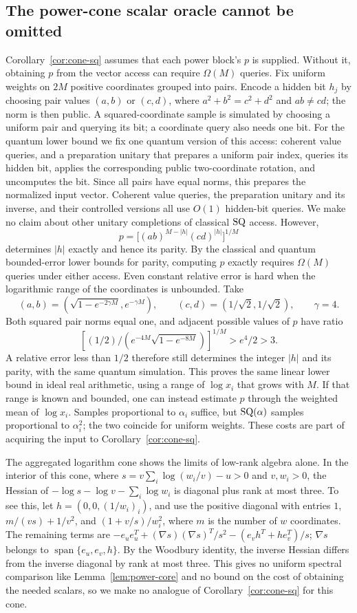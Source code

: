 \subsection{The power-cone scalar oracle cannot be omitted}
Corollary~\ref{cor:cone-sq} assumes that each power block's $p$ is
supplied. Without it, obtaining $p$ from the vector access can require
$\Omega(M)$ queries. Fix uniform weights on $2M$ positive coordinates
grouped into pairs. Encode a hidden bit $h_j$ by choosing pair values
$(a,b)$ or $(c,d)$, where $a^2+b^2=c^2+d^2$ and $ab\ne cd$; the norm is
then public. A squared-coordinate sample is simulated by choosing a
uniform pair and querying its bit; a coordinate query also needs one bit.
For the quantum lower bound we fix one quantum version of this access:
coherent value queries, and a preparation unitary that prepares a uniform
pair index, queries its hidden bit, applies the corresponding public
two-coordinate rotation, and uncomputes the bit. Since all pairs have
equal norms, this prepares the normalized input vector. Coherent value
queries, the preparation unitary and its inverse, and their controlled
versions all use $O(1)$ hidden-bit queries. We make no claim about other
unitary completions of classical $\mathrm{SQ}$ access. However,
\[
 p=\big[(ab)^{M-|h|}(cd)^{|h|}\big]^{1/M}
\]
determines $|h|$ exactly and hence its parity. By the classical and
quantum bounded-error lower bounds for parity, computing $p$ exactly
requires $\Omega(M)$ queries under either access.
Even constant relative error is hard when the logarithmic range of the
coordinates is unbounded. Take
\[
 (a,b)=(\sqrt{1-e^{-2\gamma M}},e^{-\gamma M}),\qquad
 (c,d)=(1/\sqrt2,1/\sqrt2),\qquad \gamma=4.
\]
Both squared pair norms equal one, and adjacent possible values of $p$
have ratio
\[
 [(1/2)/(e^{-4M}\sqrt{1-e^{-8M}})]^{1/M}>e^4/2>3.
\]
A relative error less than $1/2$ therefore still determines the integer
$|h|$ and its parity, with the same quantum simulation. This proves the
same linear lower bound in ideal real arithmetic, using a range of
$\log x_i$ that grows with $M$. If that range is known and bounded, one
can instead estimate $p$ through the weighted mean of $\log x_i$. Samples
proportional to $\alpha_i$ suffice, but $\mathrm{SQ}(\alpha)$ samples
proportional to $\alpha_i^2$; the two coincide for uniform weights. These
costs are part of acquiring the input to Corollary~\ref{cor:cone-sq}.

The aggregated logarithm cone shows the limits of low-rank algebra alone.
In the interior of this cone, where $s=v\sum_i\log(w_i/v)-u>0$ and
$v,w_i>0$, the Hessian of
$-\log s-\log v-\sum_i\log w_i$ is diagonal plus rank at most three.
To see this, let $h=(0,0,(1/w_i)_i)$, and use the positive diagonal
with entries $1$, $m/(vs)+1/v^2$, and $(1+v/s)/w_i^2$, where $m$
is the number of $w$ coordinates. The remaining terms are
$-e_ue_u^T+(\nabla s)(\nabla s)^T/s^2-(e_vh^T+he_v^T)/s$;
$\nabla s$ belongs to $\operatorname{span}\{e_u,e_v,h\}$.
By the Woodbury identity, the inverse Hessian differs from the inverse
diagonal by rank at most three. This gives no uniform spectral comparison
like Lemma~\ref{lem:power-core} and no bound on the cost of obtaining the
needed scalars, so we make no analogue of Corollary~\ref{cor:cone-sq}
for this cone.

